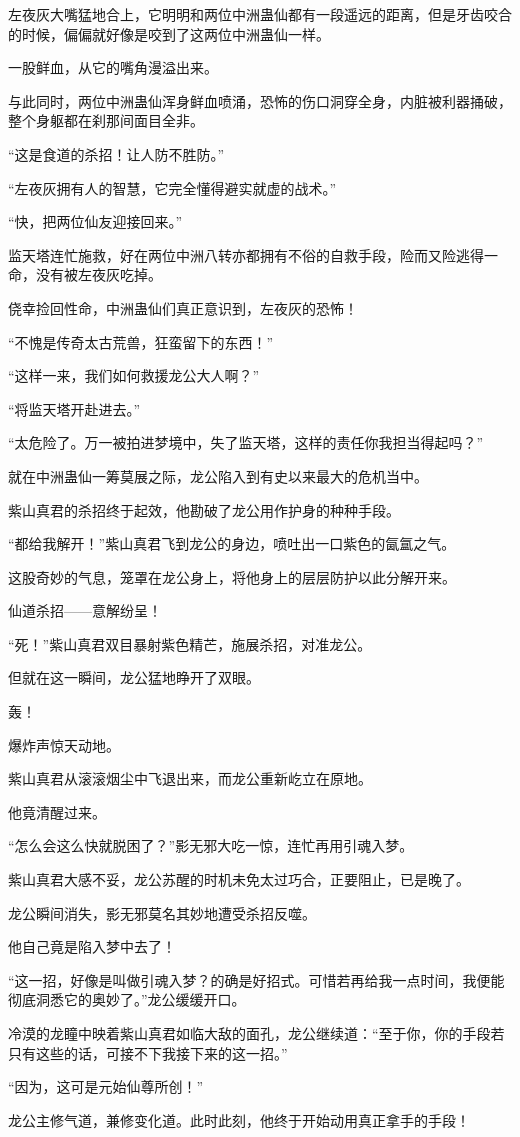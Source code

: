 \begin{this_body}
左夜灰大嘴猛地合上，它明明和两位中洲蛊仙都有一段遥远的距离，但是牙齿咬合的时候，偏偏就好像是咬到了这两位中洲蛊仙一样。

一股鲜血，从它的嘴角漫溢出来。

与此同时，两位中洲蛊仙浑身鲜血喷涌，恐怖的伤口洞穿全身，内脏被利器捅破，整个身躯都在刹那间面目全非。

“这是食道的杀招！让人防不胜防。”

“左夜灰拥有人的智慧，它完全懂得避实就虚的战术。”

“快，把两位仙友迎接回来。”

监天塔连忙施救，好在两位中洲八转亦都拥有不俗的自救手段，险而又险逃得一命，没有被左夜灰吃掉。

侥幸捡回性命，中洲蛊仙们真正意识到，左夜灰的恐怖！

“不愧是传奇太古荒兽，狂蛮留下的东西！”

“这样一来，我们如何救援龙公大人啊？”

“将监天塔开赴进去。”

“太危险了。万一被拍进梦境中，失了监天塔，这样的责任你我担当得起吗？”

就在中洲蛊仙一筹莫展之际，龙公陷入到有史以来最大的危机当中。

紫山真君的杀招终于起效，他勘破了龙公用作护身的种种手段。

“都给我解开！”紫山真君飞到龙公的身边，喷吐出一口紫色的氤氲之气。

这股奇妙的气息，笼罩在龙公身上，将他身上的层层防护以此分解开来。

仙道杀招——意解纷呈！

“死！”紫山真君双目暴射紫色精芒，施展杀招，对准龙公。

但就在这一瞬间，龙公猛地睁开了双眼。

轰！

爆炸声惊天动地。

紫山真君从滚滚烟尘中飞退出来，而龙公重新屹立在原地。

他竟清醒过来。

“怎么会这么快就脱困了？”影无邪大吃一惊，连忙再用引魂入梦。

紫山真君大感不妥，龙公苏醒的时机未免太过巧合，正要阻止，已是晚了。

龙公瞬间消失，影无邪莫名其妙地遭受杀招反噬。

他自己竟是陷入梦中去了！

“这一招，好像是叫做引魂入梦？的确是好招式。可惜若再给我一点时间，我便能彻底洞悉它的奥妙了。”龙公缓缓开口。

冷漠的龙瞳中映着紫山真君如临大敌的面孔，龙公继续道：“至于你，你的手段若只有这些的话，可接不下我接下来的这一招。”

“因为，这可是元始仙尊所创！”

龙公主修气道，兼修变化道。此时此刻，他终于开始动用真正拿手的手段！

\end{this_body}

